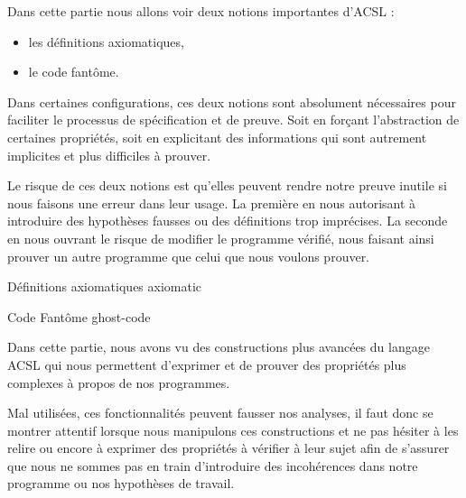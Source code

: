 Dans cette partie nous allons voir deux notions importantes d'ACSL :



\begin{itemize}
\item les définitions axiomatiques,
\item le code fantôme.
\end{itemize}


Dans certaines configurations, ces deux notions sont absolument nécessaires pour
faciliter le processus de spécification et de preuve. Soit en forçant 
l'abstraction de certaines propriétés, soit en explicitant des informations qui
sont autrement implicites et plus difficiles à prouver.



Le risque de ces deux notions est qu'elles peuvent rendre notre preuve inutile si
nous faisons une erreur dans leur usage. La première en nous autorisant à 
introduire des hypothèses fausses ou des définitions trop imprécises. La seconde
en nous ouvrant le risque de modifier le programme vérifié, nous faisant 
ainsi prouver un autre programme que celui que nous voulons prouver.


\begin{levelTwo}
  {Définitions axiomatiques}
  {axiomatic}
\end{levelTwo}


\begin{levelTwo}
  {Code Fantôme}
  {ghost-code}
\end{levelTwo}


\horizontalLine



Dans cette partie, nous avons vu des constructions plus avancées du langage ACSL
qui nous permettent d'exprimer et de prouver des propriétés plus complexes à 
propos de nos programmes.



Mal utilisées, ces fonctionnalités peuvent fausser nos analyses, il faut donc se
montrer attentif lorsque nous manipulons ces constructions et ne pas hésiter à 
les relire ou encore à exprimer des propriétés à vérifier à leur sujet afin de 
s'assurer que nous ne sommes pas en train d'introduire des incohérences dans 
notre programme ou nos hypothèses de travail.
